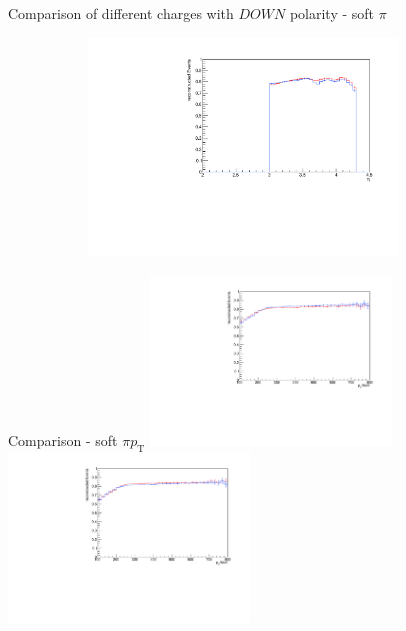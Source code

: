 \documentclass[11pt]{beamer}
\begin{document}
\begin{frame}{Comparison of different charges with $DOWN$ polarity - soft $\pi$}
\begin{figure}
\begin{subfigure}{0.45\textwidth}
\end{subfigure}
\begin{subfigure}{0.45\textwidth}
\includegraphics[width=0.9\textwidth]{sec/down_pdf/combined/h_eta_reco_SPi.pdf}
\end{subfigure}
\end{figure}
\end{frame}
\begin{frame}{Comparison - soft $\pi p_\text{T}$}
\centering
\includegraphics[width=0.48\textwidth]{sec/up_pdf/combined/h_pt_reco_SPi.pdf}
\includegraphics[width=0.48\textwidth]{sec/down_pdf/combined/h_pt_reco_SPi.pdf}
\end{frame}
\end{document}
